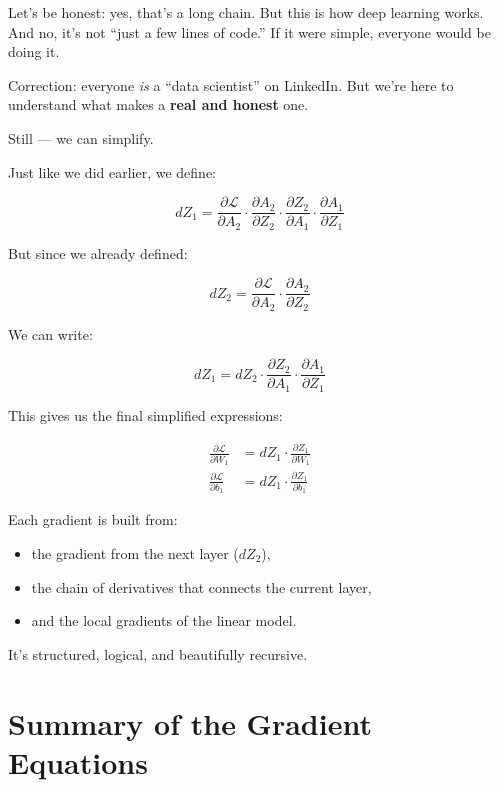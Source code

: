 \documentclass[11pt]{article}
\begin{document}
Let’s be honest: yes, that’s a long chain.  
But this is how deep learning works. And no, it’s not “just a few lines of code.”  
If it were simple, everyone would be doing it.

\begin{recapbox}[title=Side Note]
Correction: everyone \emph{is} a “data scientist” on LinkedIn.  
But we’re here to understand what makes a \textbf{real and honest} one.
\end{recapbox}

Still — we can simplify.

Just like we did earlier, we define:

\[
dZ_1 = 
\frac{\partial \mathcal{L}}{\partial A_2} \cdot 
\frac{\partial A_2}{\partial Z_2} \cdot 
\frac{\partial Z_2}{\partial A_1} \cdot 
\frac{\partial A_1}{\partial Z_1}
\]

But since we already defined:

\[
dZ_2 = \frac{\partial \mathcal{L}}{\partial A_2} \cdot \frac{\partial A_2}{\partial Z_2}
\]

We can write:

\[
dZ_1 = dZ_2 \cdot \frac{\partial Z_2}{\partial A_1} \cdot \frac{\partial A_1}{\partial Z_1}
\]

This gives us the final simplified expressions:

\[
\begin{aligned}
\frac{\partial \mathcal{L}}{\partial W_1} &= dZ_1 \cdot \frac{\partial Z_1}{\partial W_1} \\
\frac{\partial \mathcal{L}}{\partial b_1} &= dZ_1 \cdot \frac{\partial Z_1}{\partial b_1}
\end{aligned}
\]

\begin{insightbox}[title=Structure of the Backward Pass]
Each gradient is built from:
\begin{itemize}
    \item the gradient from the next layer ($dZ_2$),
    \item the chain of derivatives that connects the current layer,
    \item and the local gradients of the linear model.
\end{itemize}
It’s structured, logical, and beautifully recursive.
\end{insightbox}

\section{Summary of the Gradient Equations}
\end{document}
